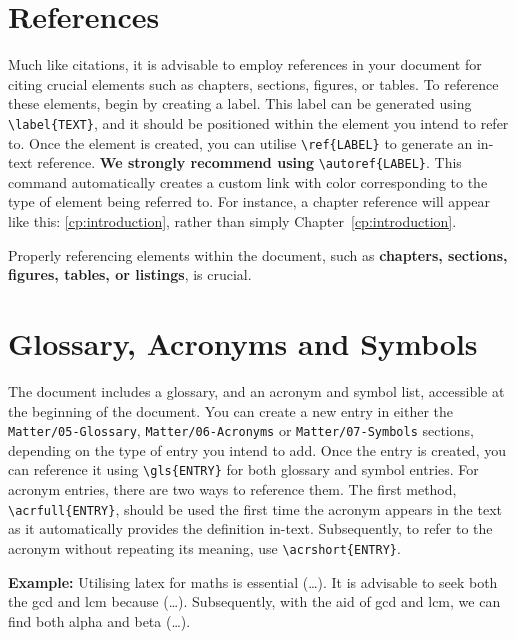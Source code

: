 \section{References}
Much like citations, it is advisable to employ references in your document for citing crucial elements such as chapters, sections, figures, or tables. To reference these elements, begin by creating a label. This label can be generated using \verb|\label{TEXT}|, and it should be positioned within the element you intend to refer to. Once the element is created, you can utilise \verb|\ref{LABEL}| to generate an in-text reference. \textbf{We strongly recommend using} \verb|\autoref{LABEL}|. This command automatically creates a custom link with color corresponding to the type of element being referred to. For instance, a chapter reference will appear like this: \autoref{cp:introduction}, rather than simply Chapter~\ref{cp:introduction}.

\begin{block}[tip]
    Properly referencing elements within the document, such as \textbf{chapters, sections, figures, tables, or listings}, is crucial.
\end{block}

\section{Glossary, Acronyms and Symbols}
The document includes a glossary, and an acronym and symbol list, accessible at the beginning of the document. You can create a new entry in either the \verb|Matter/05-Glossary|, \verb|Matter/06-Acronyms| or \verb|Matter/07-Symbols| sections, depending on the type of entry you intend to add. Once the entry is created, you can reference it using \verb|\gls{ENTRY}| for both glossary and symbol entries. For acronym entries, there are two ways to reference them. The first method, \verb|\acrfull{ENTRY}|, should be used the first time the acronym appears in the text as it automatically provides the definition in-text. Subsequently, to refer to the acronym without repeating its meaning, use \verb|\acrshort{ENTRY}|.

\vspace{.875em}
\noindent\textbf{Example:} Utilising \Gls{latex} for \Gls{maths} is essential (\ldots). It is advisable to seek both the \acrfull{gcd} and \acrfull{lcm} because (\ldots). Subsequently, with the aid of \acrshort{gcd} and \acrshort{lcm}, we can find both \gls{alpha} and \gls{beta} (\ldots).


